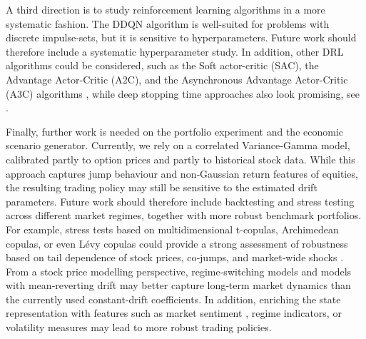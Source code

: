 A third direction is to study reinforcement learning algorithms in a more systematic fashion. The DDQN algorithm is well-suited for problems with discrete impulse-sets, but it is sensitive to hyperparameters. Future work should therefore include a systematic hyperparameter study. In addition, other DRL algorithms could be considered, such as the Soft actor-critic (SAC), the Advantage Actor-Critic (A2C), and the Asynchronous Advantage Actor-Critic (A3C) algorithms \cite{A3C16, haarnoja2018soft}, while deep stopping time approaches also look promising, see \cite{becker2019deep, han2023new, lauriere2025deep}.

Finally, further work is needed on the portfolio experiment and the economic scenario generator. Currently, we rely on a correlated Variance‑Gamma model, calibrated partly to option prices and partly to historical stock data. While this approach captures jump behaviour and non‑Gaussian return features of equities, the resulting trading policy may still be sensitive to the estimated drift parameters. Future work should therefore include backtesting and stress testing across different market regimes, together with more robust benchmark portfolios. For example, stress tests based on multidimensional t-copulas, Archimedean copulas, or even Lévy copulas could provide a strong assessment of robustness based on tail dependence of stock prices, co‑jumps, and market‑wide shocks \cite{mcneil2015quantitative, tankov2004simulation, KALLSEN20061551, GROTHE2015182}. From a stock price modelling perspective, regime‑switching models \cite{korn2017stochastic, das2018risk, wu2025recursive} and models with mean‑reverting drift may better capture long‑term market dynamics than the currently used constant‑drift coefficients. In addition, enriching the state representation with features such as market sentiment \cite{MAO2024102048}, regime indicators, or volatility measures may lead to more robust trading policies.